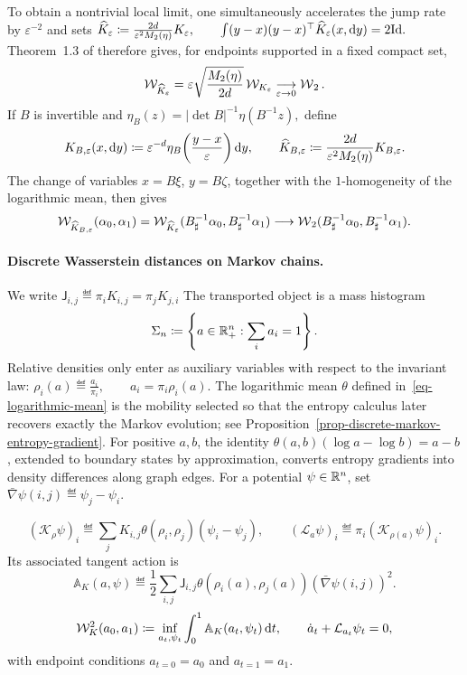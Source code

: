 To obtain a nontrivial local limit, one simultaneously accelerates the jump rate by $\varepsilon^{-2}$ and sets
\(\widehat K_\varepsilon \coloneqq \frac{2d}{\varepsilon^2M_2(\eta)}K_\varepsilon, \qquad \int (y-x)(y-x)^\top\widehat K_\varepsilon(x,\mathrm{d} y)=2\mathrm{Id}.\)
Theorem~1.3 of therefore gives, for endpoints supported in a fixed compact set,
\[
\mathcal W_{\widehat K_\varepsilon}
=
\varepsilon\sqrt{\frac{M_2(\eta)}{2d}}\,
\mathcal W_{K_\varepsilon}
\underset{\varepsilon\to0}{\longrightarrow}
\operatorname{\mathcal{W}}_2.
\]
If $B$ is invertible and
\(\eta_B(z)=|\det B|^{-1}\eta(B^{-1}z),\)
define
\[
K_{B,\varepsilon}(x,\mathrm{d} y)
\coloneqq
\varepsilon^{-d}\eta_B\!\left(\frac{y-x}{\varepsilon}\right)\mathrm{d} y,
\qquad
\widehat K_{B,\varepsilon}
\coloneqq
\frac{2d}{\varepsilon^2M_2(\eta)}K_{B,\varepsilon}.
\]
The change of variables $x=B\xi$, $y=B\zeta$, together with the $1$-homogeneity of the logarithmic mean, then gives
\[
\mathcal W_{\widehat K_{B,\varepsilon}}(\alpha_0,\alpha_1)
=
\mathcal W_{\widehat K_\varepsilon}(B^{-1}_\sharp\alpha_0,B^{-1}_\sharp\alpha_1)
\longrightarrow
\operatorname{\mathcal{W}}_2(B^{-1}_\sharp\alpha_0,B^{-1}_\sharp\alpha_1).
\]
\paragraph{Discrete Wasserstein distances on Markov chains.}\label{sec-discrete-wasserstein-markov}
We write
\(\mathsf J_{i,j}\eqdef \pi_iK_{i,j}=\pi_jK_{j,i}\)
The transported object is a mass histogram
\[
\Sigma_n\coloneqq\left\{a\in\mathbb{R}_+^n:\sum_i a_i=1\right\}.
\]
Relative densities only enter as auxiliary variables with respect to the invariant law: \(\rho_i(a)\eqdef \frac{a_i}{\pi_i}, \qquad a_i=\pi_i\rho_i(a).\)
The logarithmic mean \(\theta\) defined in~\eqref{eq-logarithmic-mean} is the mobility selected so that the entropy calculus later recovers exactly the Markov evolution; see Proposition~\ref{prop-discrete-markov-entropy-gradient}. For positive $a,b$, the identity \(\theta(a,b)(\log a-\log b)=a-b\), extended to boundary states by approximation, converts entropy gradients into density differences along graph edges. For a potential \(\psi\in\mathbb{R}^n\), set
\(\bar\nabla\psi(i,j)\eqdef\psi_j-\psi_i.\)
\begin{defn}\label{def-discrete-markov-wasserstein}
\begin{equation}
\label{eq-discrete-markov-onsager}
(\mathcal K_\rho\psi)_i
\eqdef
\sum_j K_{i,j}\theta(\rho_i,\rho_j)(\psi_i-\psi_j),
\qquad
(\mathcal L_a\psi)_i
\eqdef
\pi_i(\mathcal K_{\rho(a)}\psi)_i.
\end{equation}
Its associated tangent action is
\begin{equation}
\label{eq-discrete-markov-action}
\mathbb A_K(a,\psi)
\eqdef
\frac12\sum_{i,j}\mathsf J_{i,j}\theta(\rho_i(a),\rho_j(a))
(\bar\nabla\psi(i,j))^2.
\end{equation}
\begin{equation}
\label{eq-discrete-markov-distance}
\mathcal W_K^2(a_0,a_1)
\coloneqq
\inf_{a_t,\psi_t}
\int_0^1\mathbb A_K(a_t,\psi_t)\,\mathrm{d} t,
\qquad
\dot a_t+\mathcal L_{a_t}\psi_t=0,
\end{equation}
with endpoint conditions \(a_{t=0}=a_0\) and \(a_{t=1}=a_1\).
\end{defn}
